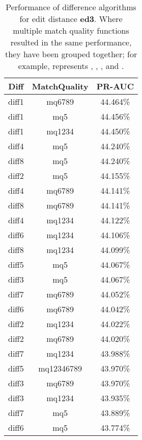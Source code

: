 \begin{table}[tbph]
\begin{center}
\begin{tabular}{|c|c||c|}
\hline
Diff & MatchQuality & PR-AUC  \\
\hline
\hline
diff1 & mq6789 & 44.464\% \\
diff1 & mq5 & 44.456\% \\
diff1 & mq1234 & 44.450\% \\
diff4 & mq5 & 44.240\% \\
diff8 & mq5 & 44.240\% \\
diff2 & mq5 & 44.155\% \\
diff4 & mq6789 & 44.141\% \\
diff8 & mq6789 & 44.141\% \\
diff4 & mq1234 & 44.122\% \\
diff6 & mq1234 & 44.106\% \\
diff8 & mq1234 & 44.099\% \\
diff5 & mq5 & 44.067\% \\
diff3 & mq5 & 44.067\% \\
diff7 & mq6789 & 44.052\% \\
diff6 & mq6789 & 44.042\% \\
diff2 & mq1234 & 44.022\% \\
diff2 & mq6789 & 44.020\% \\
diff7 & mq1234 & 43.988\% \\
diff5 & mq12346789 & 43.970\% \\
diff3 & mq6789 & 43.970\% \\
diff3 & mq1234 & 43.935\% \\
diff7 & mq5 & 43.889\% \\
diff6 & mq5 & 43.774\% \\
\hline
\end{tabular}
\end{center}
\caption[Comparison of diff algorithms using edit distance \textbf{ed3}]{
  Performance of difference algorithms for
  edit distance \textbf{ed3}.  Where multiple match
  quality functions resulted in the same performance, they
  have been grouped together; for example,  represents
  , , , and .}
\label{tab:editlongbyed3}
\end{table}
